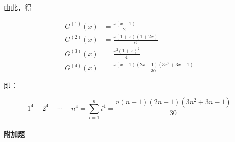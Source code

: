 \documentclass{../notes}
\newcommand{\Gx}[1]{G^{(#1)}(x)}
\begin{document}
    由此，得

    \begin{equation}
        \begin{aligned}
            \Gx 1 &= \frac{x(x+1)}{2} \\
            \Gx 2 &= \frac{x(1+x)(1+2x)}{6} \\
            \Gx 3 &= \frac{x^2(1 + x)^2}{4} \\
            \Gx 4 &= \frac{x(x+1) (2x+1) \left(3x^2+3 x-1\right)}{30}
        \end{aligned}
    \end{equation}

    即：

    \begin{equation}
        1^4 + 2^4 + \cdots + n^4 = \sum_{i=1}^n i^4 = \frac{n(n+1) (2n+1) \left(3n^2+3 n-1\right)}{30}
    \end{equation}

    \paragraph*{附加题}
\end{document}
